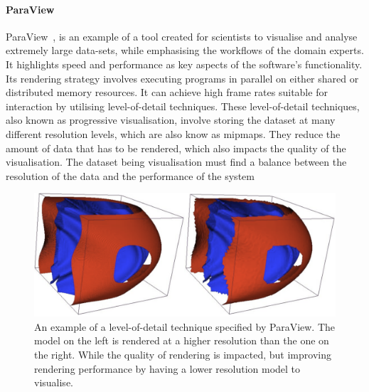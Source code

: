 \paragraph{ParaView}
ParaView~\cite{Ahrens2005}, is an example of a tool created for scientists to visualise and analyse extremely large data-sets,
while emphasising the workflows of the domain experts.
It highlights speed and performance as key aspects of the software's functionality.
Its rendering strategy involves executing programs in parallel on either shared or distributed memory resources.
It can achieve high frame rates suitable for interaction by utilising level-of-detail techniques.
These level-of-detail techniques, also known as progressive visualisation, involve storing the dataset at many different resolution levels, which are also know as mipmaps.
They reduce the amount of data that has to be rendered, which also impacts the quality of the visualisation.
The dataset being visualisation must find a balance between the resolution of the data and the performance of the system
\begin{figure}
    \centering
    \includegraphics[width=0.6\linewidth]{figures/paraview.png}
    \caption{An example of a level-of-detail technique specified by ParaView. The model on the left is rendered at a higher resolution than the one on the right. While the quality of rendering is impacted, but improving rendering performance by having a lower resolution model to visualise.}
    \label{fig:paraview}
\end{figure}

